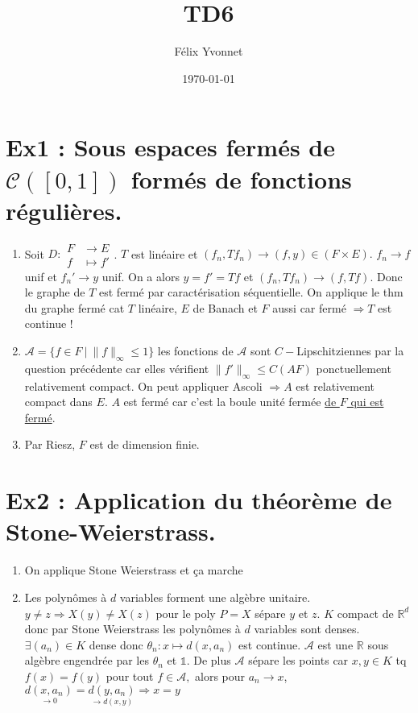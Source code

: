 \documentclass[a4paper]{article}
\title{TD6}
\author{Félix Yvonnet}
\date{\today}
\begin{document}
\maketitle
\section*{Ex1 : Sous espaces fermés de $ \mathcal{C}([0,1])$ formés de fonctions régulières.}

\begin{enumerate}
    \item Soit $D :\begin{aligned}
        F &\longrightarrow E \\
        f &\longmapsto f'
    \end{aligned}$. $T$ est linéaire et $(f_n,Tf_n)\to (f,y)\in (F\times E).$ $f_n\to f$ unif et $f_n'\to y$ unif. On a alors $y=f'=Tf$ et $(f_n,Tf_n)\to (f,Tf).$ Donc le graphe de $T$ est fermé par caractérisation séquentielle. On applique le thm du graphe fermé cat $T$ linéaire, $E$ de Banach et $F$ aussi car fermé $\Rightarrow T$ est continue !

\item $\mathcal{A}=\{f\in F\ |\ \|f\|_\infty \le 1\} $ les fonctions de $\mathcal{A}$ sont $C-$Lipschitziennes par la question précédente car elles vérifient $\|f'\|_\infty \le C (AF)$ ponctuellement relativement compact. On peut appliquer Ascoli $\Rightarrow A$  est relativement compact dans $E.$ $A$ est fermé car c'est la boule unité fermée \underline{de $F$ qui est fermé}.
    \item Par Riesz, $F$ est de dimension finie.
\end{enumerate}



\section*{Ex2 : Application du théorème de Stone-Weierstrass.}
\begin{enumerate}
    \item On applique Stone Weierstrass et ça marche
    \item Les polynômes à $d$ variables forment une algèbre unitaire. $y\neq z\Rightarrow X(y) \neq X(z)$ pour le poly $P=X$ sépare $y$ et $z.$ $K$ compact de $\mathbb{R} ^d$ donc par Stone Weierstrass les polynômes à $d$ variables sont denses.\\
        $\exists (a_n)\in K$ dense donc $\theta_n: x\mapsto d(x,a_n)$ est continue. $\mathcal{A}$ est une $\mathbb{R} $ sous algèbre engendrée par les $\theta_n$ et $\mathbb{1}.$ De plus $\mathcal{A}$ sépare les points car $x,y\in K$ tq $f(x)=f(y)$ pour tout $f\in \mathcal{A},$ alors pour $a_n\to x$, $\underset{\to 0}{d(x,a_n)}=\underset{\to d(x,y)}{d(y,a_n)}\Rightarrow x=y$
\end{enumerate}
\end{document}
